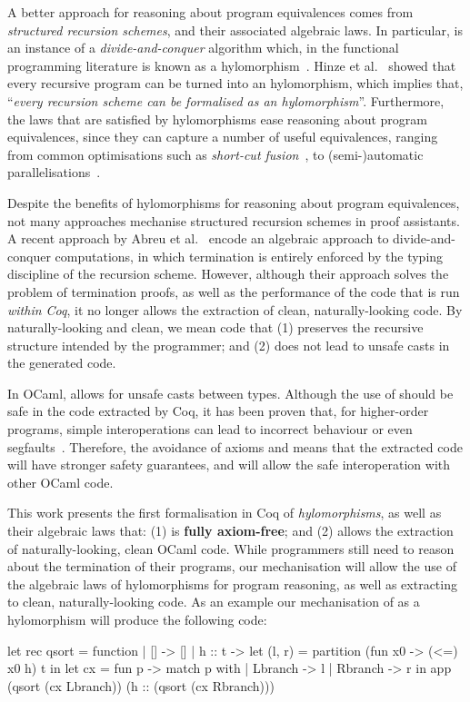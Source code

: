 \documentclass[anonymous, a4paper, UKenglish, cleveref, autoref, thm-restate]{lipics-v2021}
\begin{document}
A better approach for reasoning about program equivalences comes from
\emph{structured recursion schemes}, and their associated algebraic laws.  In
particular,  is an instance of a \emph{divide-and-conquer}
algorithm which, in the functional programming literature is known as a
hylomorphism~\cite{MeijerFP91, HuIT96}.  Hinze et al.~\cite{HinzeWG15} showed
that every recursive program can be turned into an hylomorphism, which implies
that, ``\emph{every recursion scheme can be formalised as an hylomorphism}''.
Furthermore, the laws that are satisfied by hylomorphisms ease reasoning about
program equivalences, since they can capture a number of useful equivalences,
ranging from common optimisations such as \emph{short-cut
fusion}~\cite{TakanoM95}, to (semi-)automatic
parallelisations~\cite{Gibbons96:Third, farmsCastro}.

Despite the benefits of hylomorphisms for reasoning about program equivalences,
not many approaches mechanise structured recursion schemes in proof assistants.
A recent approach by Abreu et al.~\cite{AbreuDHJMS23} encode an algebraic
approach to divide-and-conquer computations, in which termination is entirely
enforced by the typing discipline of the recursion scheme. However, although
their approach solves the problem of termination proofs, as well as the
performance of the code that is run \emph{within Coq}, it no longer allows the
extraction of clean, naturally-looking code.  By naturally-looking and clean,
we mean code that (1) preserves the recursive structure intended by the
programmer; and (2) does not lead to unsafe casts  in the
generated code. 

In OCaml,  allows for unsafe casts between types.
Although the use of  should be safe in the code
extracted by Coq, it has been proven that, for higher-order programs, simple
interoperations can lead to incorrect behaviour or even
segfaults~\cite{forster:hal-04329663}. Therefore, the avoidance of axioms and
 means that the extracted code will have stronger
safety guarantees, and will allow the safe interoperation with other OCaml
code.

This work presents the first formalisation in Coq of \emph{hylomorphisms}, as
well as their algebraic laws that: (1) is \textbf{fully axiom-free}; and (2)
allows the extraction of naturally-looking, clean OCaml code. While programmers
still need to reason about the termination of their programs, our mechanisation
will allow the use of the algebraic laws of hylomorphisms for program
reasoning, as well as extracting to clean, naturally-looking code. As an
example our mechanisation of  as a hylomorphism will produce
the following code:
\begin{coqcode}
let rec qsort = function
  | [] -> []
  | h :: t ->
    let (l, r) = partition (fun x0 -> (<=) x0 h) t in
    let cx = fun p -> match p with | Lbranch -> l | Rbranch -> r in 
    app (qsort (cx Lbranch)) (h :: (qsort (cx Rbranch)))
\end{coqcode}
\end{document}
